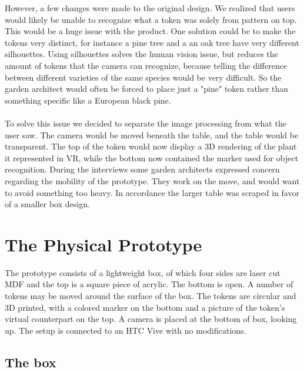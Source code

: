 However, a few changes were made to the original design. We realized that users would likely be unable to recognize what a token was solely from pattern on top. This would be a huge issue with the product. One solution could be to make the tokens very distinct, for instance a pine tree and a an oak tree have very different silhouettes. Using silhouettes solves the human vision issue, but reduces the amount of tokens that the camera can recognize, because telling the difference between different varieties of the same species would be very difficult. So the garden architect would often be forced to place just a "pine" token rather than something specific like a European black pine.\\\\
To solve this issue we decided to separate the image processing from what the user saw. The camera would be moved beneath the table, and the table would be transparent. The top of the token would now display a 3D rendering of the plant it represented in VR, while the bottom now contained the marker used for object recognition. During the interviews some garden architects expressed concern regarding the mobility of the prototype. They work on the move, and would want to avoid something too heavy. In accordance the larger table was scraped in favor of a smaller box design.

\section{The Physical Prototype}
The prototype consists of a lightweight box, of which four sides are laser cut MDF and the top is a square piece of acrylic. The bottom is open. A number of tokens may be moved around the surface of the box. The tokens are circular and 3D printed, with a colored marker on the bottom and a picture of the token's virtual counterpart on the top. A camera is placed at the bottom of box, looking up. 
The setup is connected to an HTC Vive with no modifications.

\subsection{The box}

